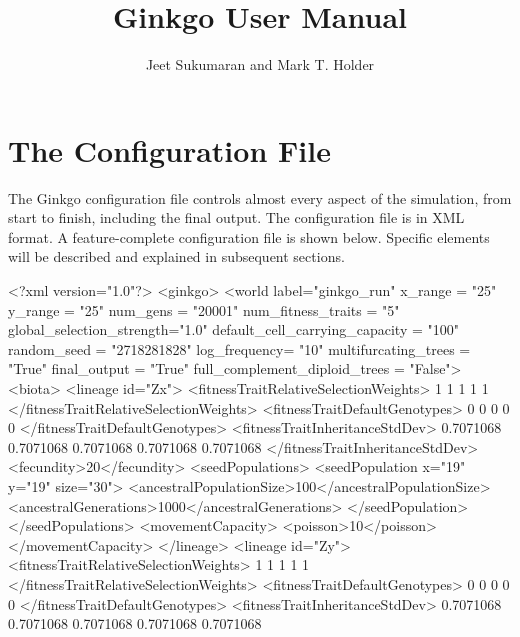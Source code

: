 \documentclass[11pt]{article}
\title{Ginkgo User Manual}
\author{Jeet Sukumaran and Mark T. Holder}
\date{}                                           %
\begin{document}
\maketitle

\part{The Configuration File}

The Ginkgo configuration file controls almost every aspect of the simulation, from start to finish, including the final output.
The configuration file is in XML format.
A feature-complete configuration file is shown below.
Specific elements will be described and explained in subsequent sections.
\begin{ginkgoxml}
<?xml version="1.0"?>
<ginkgo>
    <world label="ginkgo_run"
           x_range = "25"
           y_range = "25"
           num_gens = "20001"
           num_fitness_traits = "5"
           global_selection_strength="1.0"
           default_cell_carrying_capacity = "100"
           random_seed = "2718281828"
           log_frequency= "10"
           multifurcating_trees = "True"
           final_output = "True"
           full_complement_diploid_trees = "False">
        <biota>
            <lineage id="Zx">
                <fitnessTraitRelativeSelectionWeights>
                	1 1 1 1 1
                </fitnessTraitRelativeSelectionWeights>
                <fitnessTraitDefaultGenotypes>
                	0 0 0 0 0
                </fitnessTraitDefaultGenotypes>
                <fitnessTraitInheritanceStdDev>
                	0.7071068 0.7071068 0.7071068 0.7071068 0.7071068
                </fitnessTraitInheritanceStdDev>
                <fecundity>20</fecundity>
                <seedPopulations>
                    <seedPopulation x="19" y="19" size="30">
                        <ancestralPopulationSize>100</ancestralPopulationSize>
                        <ancestralGenerations>1000</ancestralGenerations>
                    </seedPopulation>
                </seedPopulations>
                <movementCapacity>
                    <poisson>10</poisson>
                </movementCapacity>
            </lineage>
            <lineage id="Zy">
                <fitnessTraitRelativeSelectionWeights>
                	1 1 1 1 1
                </fitnessTraitRelativeSelectionWeights>
                <fitnessTraitDefaultGenotypes>
                	0 0 0 0 0
                </fitnessTraitDefaultGenotypes>
                <fitnessTraitInheritanceStdDev>
                	0.7071068 0.7071068 0.7071068 0.7071068 0.7071068

\end{ginkgoxml}
\end{document}
